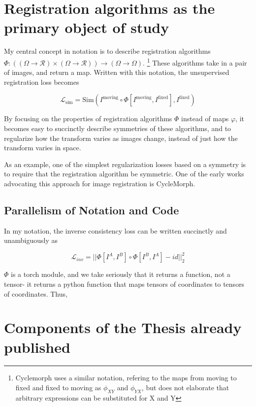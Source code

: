 \documentclass{article}
\begin{document}
\section{Registration algorithms as the primary object of study}

My central concept in notation is to describe registration algorithms $\Phi:
	\left( (\Omega \rightarrow \mathcal{R}) \times (\Omega \rightarrow \mathcal{R})
	\right) \rightarrow (\Omega \rightarrow \Omega) $. \footnote{Cyclemorph
	\cite{cyclemorph} uses a similar notation, refering to the maps from moving to
	fixed and fixed to moving as $\phi_{XY}$ and $\phi_{YX}$, but does not
	elaborate that arbitrary expressions can be substituted for X and Y} These
algorithms take in a pair of images, and return a map. Written with this
notation, the unsupervised registration loss becomes

$$ \mathcal{L}_\text{sim} = \text{Sim}(I^\text{moving} \circ  \Phi[I^\text{moving}, I^\text{fixed}] , I^\text{fixed}) $$

By focusing on the properties of registration algorithms $\Phi$ instead of maps
$\varphi$, it becomes easy to succinctly describe symmetries of these
algorithms, and to regularize how the transform varies as images change,
instead of just how the transform varies in space.

As an example, one of the simplest regularization losses based on a symmetry is
to require that the registration algorithm be symmetric. One of the early works
advocating this approach for image registration is CycleMorph.

\subsection{Parallelism of Notation and Code}

In my notation, the inverse consistency loss can be written succinctly and
unambiguously as

$$ \mathcal{L}_{inv} = ||\Phi[I^A, I^B] \circ \Phi[I^B, I^A] - id||^2_2$$

$\Phi$ is a torch module, and we take seriously that it returns a function, not a tensor- it returns a python function that maps tensors of coordinates to tensors of coordinates. Thus,


\section{Components of the Thesis already published}
\end{document}
